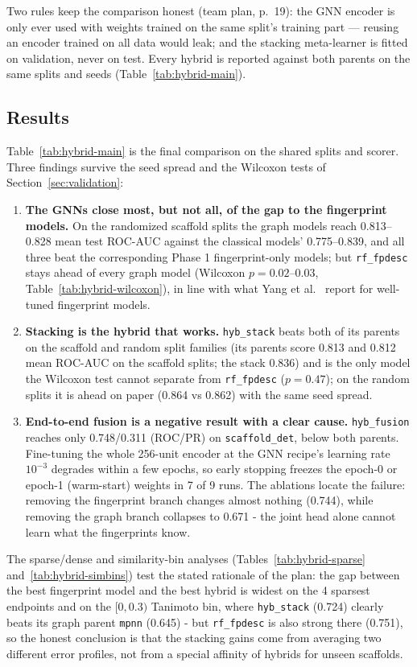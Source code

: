 Two rules keep the comparison honest (team plan, p.~19): the GNN encoder is only ever used
with weights trained on the same split's training part --- reusing an encoder trained on
all data would leak; and the stacking meta-learner is fitted on validation, never on test.
Every hybrid is reported against both parents on the same splits and seeds
(Table~\ref{tab:hybrid-main}).

\subsection{Results}
Table~\ref{tab:hybrid-main} is the final comparison on the shared splits and scorer. Three
findings survive the seed spread and the Wilcoxon tests of Section~\ref{sec:validation}:

\begin{enumerate}
\item \textbf{The GNNs close most, but not all, of the gap to the fingerprint models.}
On the randomized scaffold splits the graph models reach 0.813--0.828 mean test ROC-AUC
against the classical models' 0.775--0.839, and all three beat the corresponding Phase 1
fingerprint-only models; but \texttt{rf\_fpdesc} stays ahead of every graph model
(Wilcoxon $p=0.02$--$0.03$, Table~\ref{tab:hybrid-wilcoxon}), in line with what
Yang et al.~\cite{yang2019analyzing} report for well-tuned fingerprint models.
\item \textbf{Stacking is the hybrid that works.} \texttt{hyb\_stack} beats both of its
parents on the scaffold and random split families (its parents score 0.813 and 0.812 mean
ROC-AUC on the scaffold splits; the stack 0.836) and is the only model the Wilcoxon test
cannot separate from \texttt{rf\_fpdesc} ($p=0.47$); on the random splits it is ahead on
paper (0.864 vs 0.862) with the same seed spread.
\item \textbf{End-to-end fusion is a negative result with a clear cause.}
\texttt{hyb\_fusion} reaches only 0.748/0.311 (ROC/PR) on \texttt{scaffold\_det}, below
both parents. Fine-tuning the whole 256-unit encoder at the GNN recipe's learning rate
$10^{-3}$ degrades within a few epochs, so early stopping freezes the epoch-0 or epoch-1
(warm-start) weights in 7 of 9 runs. The ablations locate the failure: removing the fingerprint branch
changes almost nothing (0.744), while removing the graph branch collapses to 0.671 - the
joint head alone cannot learn what the fingerprints know.
\end{enumerate}

The sparse/dense and similarity-bin analyses (Tables~\ref{tab:hybrid-sparse}
and~\ref{tab:hybrid-simbins}) test the stated rationale of the plan: the gap between the
best fingerprint model and the best hybrid is widest on the 4 sparsest endpoints and on
the $[0,0.3)$ Tanimoto bin, where \texttt{hyb\_stack} (0.724) clearly beats its graph
parent \texttt{mpnn} (0.645) - but \texttt{rf\_fpdesc} is also strong there (0.751), so
the honest conclusion is that the stacking gains come from averaging two different error
profiles, not from a special affinity of hybrids for unseen scaffolds.

